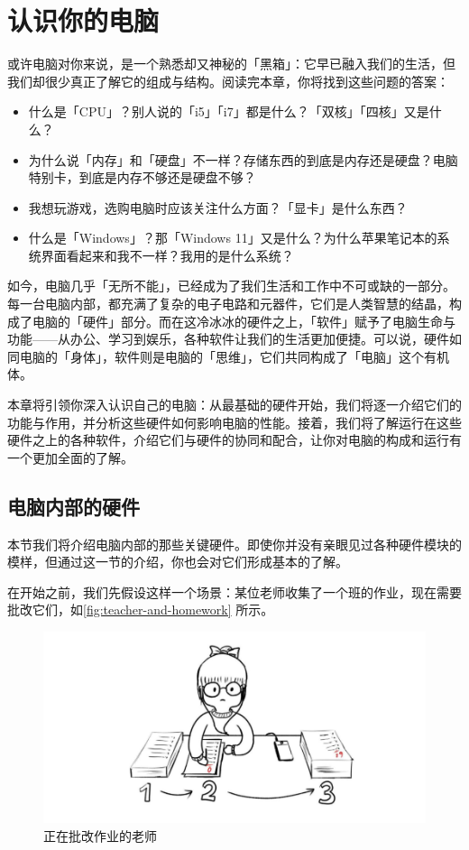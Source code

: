 \chapter{认识你的电脑}
\label{cha:computer-and-its-components}

\begin{intro}
  或许电脑对你来说，是一个熟悉却又神秘的「黑箱」：它早已融入我们的生活，但我们却很少真正了解它的组成与结构。阅读完本章，你将找到这些问题的答案：

  \begin{itemize}
    \item 什么是「CPU」？别人说的「i5」「i7」都是什么？「双核」「四核」又是什么？
    \item 为什么说「内存」和「硬盘」不一样？存储东西的到底是内存还是硬盘？电脑特别卡，到底是内存不够还是硬盘不够？
    \item 我想玩游戏，选购电脑时应该关注什么方面？「显卡」是什么东西？
    \item 什么是「Windows」？那「Windows 11」又是什么？为什么苹果笔记本的系统界面看起来和我不一样？我用的是什么系统？
  \end{itemize}
\end{intro}

如今，电脑几乎「无所不能」，已经成为了我们生活和工作中不可或缺的一部分。每一台电脑内部，都充满了复杂的电子电路和元器件，它们是人类智慧的结晶，构成了电脑的「硬件」部分。而在这冷冰冰的硬件之上，「软件」赋予了电脑生命与功能——从办公、学习到娱乐，各种软件让我们的生活更加便捷。可以说，硬件如同电脑的「身体」，软件则是电脑的「思维」，它们共同构成了「电脑」这个有机体。

本章将引领你深入认识自己的电脑：从最基础的硬件开始，我们将逐一介绍它们的功能与作用，并分析这些硬件如何影响电脑的性能。接着，我们将了解运行在这些硬件之上的各种软件，介绍它们与硬件的协同和配合，让你对电脑的构成和运行有一个更加全面的了解。

\section{电脑内部的硬件} 

本节我们将介绍电脑内部的那些关键硬件。即使你并没有亲眼见过各种硬件模块的模样，但通过这一节的介绍，你也会对它们形成基本的了解。

在开始之前，我们先假设这样一个场景：某位老师收集了一个班的作业，现在需要批改它们，如\autoref{fig:teacher-and-homework} 所示。

\begin{figure}[htb!]
  \centering
  \includegraphics[width=.5\textwidth]{assets/basic/Teacher_and_homework.png}
  \caption{正在批改作业的老师}
  \label{fig:teacher-and-homework}
\end{figure}

